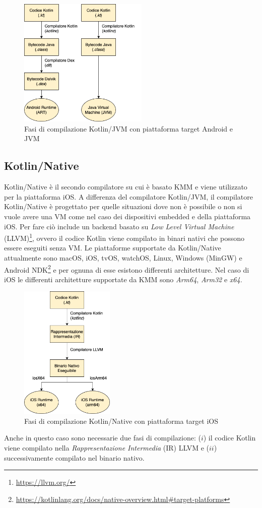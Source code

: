 \begin{figure}[H]
\centering
\includegraphics[width=0.55\textwidth]{img/tesi-9-kotlinjvm.drawio.png}
\caption{Fasi di compilazione Kotlin/JVM con piattaforma target Android e JVM}
\end{figure}

\subsection{Kotlin/Native}
Kotlin/Native è il secondo compilatore su cui è basato KMM e viene utilizzato per la piattaforma iOS. A differenza del compilatore Kotlin/JVM, il compilatore Kotlin/Native è progettato per quelle situazioni dove non è possibile o non si vuole avere una VM come nel caso dei dispositivi embedded e della piattaforma iOS. Per fare ciò include un backend basato su \textit{Low Level Virtual Machine} (LLVM)\footnote{\url{https://llvm.org/}}, ovvero il codice Kotlin viene compilato in binari nativi che possono essere eseguiti senza VM\cite{nagy2022simplifying}. Le piattaforme supportate da Kotlin/Native attualmente sono macOS, iOS, tvOS, watchOS, Linux, Windows (MinGW) e Android NDK\footnote{\url{https://kotlinlang.org/docs/native-overview.html\#target-platforms}} e per ognuna di esse esistono differenti architetture. Nel caso di iOS le differenti architetture supportate da KMM sono \textit{Arm64}, \textit{Arm32} e \textit{x64}.
\begin{figure}[H]
\centering
\includegraphics[width=0.4\textwidth]{img/tesi-10-kotlinnative.drawio.png}
\caption{Fasi di compilazione Kotlin/Native con piattaforma target iOS}
\end{figure}
Anche in questo caso sono necessarie due fasi di compilazione: ($i$) il codice Kotlin viene compilato nella \textit{Rappresentazione Intermedia} (IR) LLVM e ($ii$) successivamente compilato nel binario nativo.

